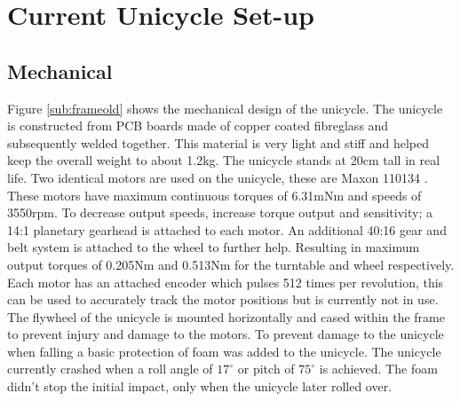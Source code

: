 \documentclass[twoside,twocolumn,12pt]{article}
\begin{document}
\section{Current Unicycle Set-up}
\subsection{Mechanical}
Figure \ref{sub:frameold} shows the mechanical design of the unicycle. The unicycle is constructed from PCB boards made of copper coated fibreglass and subsequently welded together. This material is very light and stiff and helped keep the overall weight to about 1.2kg. The unicycle stands at 20cm tall in real life.
\newline
Two identical motors are used on the unicycle, these are Maxon 110134 \cite{motor}. These motors have maximum continuous torques of 6.31mNm and speeds of 3550rpm. To decrease output speeds, increase torque output and sensitivity; a 14:1 planetary gearhead \cite{gear} is attached to each motor. An additional 40:16 gear and belt system is attached to the wheel to further help. Resulting in maximum output torques of 0.205Nm and 0.513Nm for the turntable and wheel respectively. Each motor has an attached encoder which pulses 512 times per revolution, this can be used to accurately track the motor positions but is currently not in use.
\newline
The flywheel of the unicycle is mounted horizontally and cased within the frame to prevent injury and damage to the motors.
\newline
To prevent damage to the unicycle when falling a basic protection of foam was added to the unicycle. The unicycle currently crashed when a roll angle of $17^{\circ}$ or pitch of $75^{\circ}$ is achieved. The foam didn't stop the initial impact, only when the unicycle later rolled over. 
\end{document}
